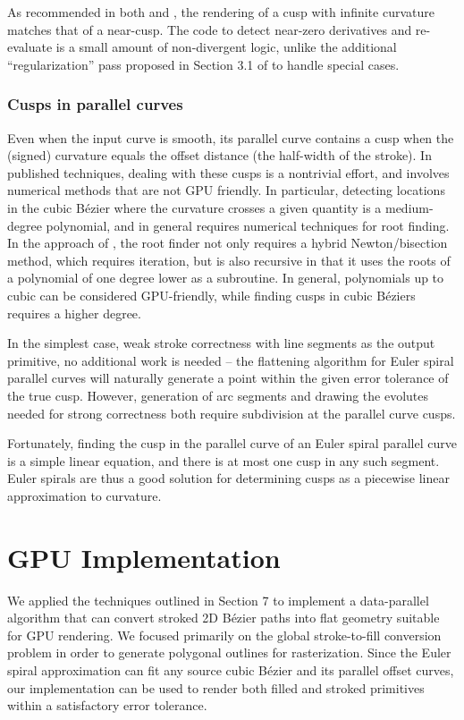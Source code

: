\documentclass[sigconf, authordraft]{acmart}
\begin{document}
As recommended in both \citet{Nehab2020} and \citet{Kilgard2020}, the rendering of a cusp with infinite curvature matches that of a near-cusp. The code to detect near-zero derivatives and re-evaluate is a small amount of non-divergent logic, unlike the additional ``regularization'' pass proposed in Section 3.1 of \citet{Nehab2020} to handle special cases.

\subsubsection{Cusps in parallel curves}

Even when the input curve is smooth, its parallel curve contains a cusp when the (signed) curvature equals the offset distance (the half-width of the stroke). In published techniques, dealing with these cusps is a nontrivial effort, and involves numerical methods that are not GPU friendly. In particular, detecting locations in the cubic Bézier where the curvature crosses a given quantity is a medium-degree polynomial, and in general requires numerical techniques for root finding. In the approach of \citet{Nehab2020}, the root finder not only requires a hybrid Newton/bisection method, which requires iteration, but is also recursive in that it uses the roots of a polynomial of one degree lower as a subroutine. In general, polynomials up to cubic can be considered GPU-friendly, while finding cusps in cubic Béziers requires a higher degree.

In the simplest case, weak stroke correctness with line segments as the output primitive, no additional work is needed -- the flattening algorithm for Euler spiral parallel curves will naturally generate a point within the given error tolerance of the true cusp. However, generation of arc segments and drawing the evolutes needed for strong correctness both require subdivision at the parallel curve cusps.

Fortunately, finding the cusp in the parallel curve of an Euler spiral parallel curve is a simple linear equation, and there is at most one cusp in any such segment. Euler spirals are thus a good solution for determining cusps as a piecewise linear approximation to curvature.

\section{GPU Implementation} \label{section:gpu-impl}

We applied the techniques outlined in Section 7 to implement a data-parallel algorithm that can convert stroked 2D Bézier paths into flat geometry suitable for GPU rendering. We focused primarily on the global stroke-to-fill conversion problem in order to generate polygonal outlines for rasterization. Since the Euler spiral approximation can fit any source cubic Bézier and its parallel offset curves, our implementation can be used to render both filled and stroked primitives within a satisfactory error tolerance.
\end{document}
